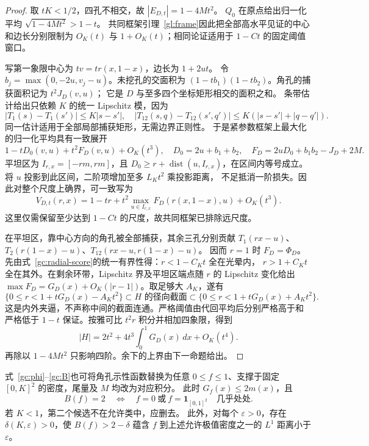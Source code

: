 \begin{proof}
取 $tK<1/2$，四孔不相交，故 $|E_{D,t}|=1-4Mt^2$。
$Q_0$ 在原点给出归一化平均 $\sqrt{1-4Mt^2}>1-t$。
共同框架引理~\ref{gl:frame}因此把全部高水平见证的中心和边长分别限制为
$O_K(t)$ 与 $1+O_K(t)$；相同论证适用于 $1-Ct$ 的固定阈值窗口。

写第一象限中心为 $tv=tr(x,1-x)$，边长为 $1+2ut$。
令 $b_j=\max(0,-2u,v_j-u)$。未挖孔的交面积为
$(1-tb_1)(1-tb_2)$。角孔的捕获面积记为 $t^2J_D(v,u)$；
它是 $D$ 与至多四个坐标矩形相交的面积之和。
条带估计给出只依赖 $K$ 的统一 Lipschitz 模，因为
\[
 |T_1(s)-T_1(s')|\le K|s-s'|,\quad
 |T_{12}(s,q)-T_{12}(s',q')|\le K(|s-s'|+|q-q'|).
\]
同一估计适用于全部局部捕获矩形，无需边界正则性。
于是紧参数框架上最大化的归一化平均具有一致展开
\[
 1-tD_0(v,u)+t^2F_D(v,u)+O_K(t^3),\quad
 D_0=2u+b_1+b_2,\quad F_D=2uD_0+b_1b_2-J_D+2M.
\]
平坦区为 $I_{r,x}=[-rm,rm]$，且
$D_0\ge r+\operatorname{dist}(u,I_{r,x})$，在区间内等号成立。
将 $u$ 投影到此区间，二阶项增加至多 $L_Kt^2$ 乘投影距离，
不足抵消一阶损失。因此对整个尺度上确界，可一致写为
\begin{equation}\label{gc:radial-score}
 V_{D,t}(r,x)=1-tr+t^2\max_{u\in I_{r,x}}F_D(r(x,1-x),u)+O_K(t^3).
\end{equation}
这里仅需保留至少达到 $1-Ct$ 的尺度，故共同框架已排除远尺度。

在平坦区，靠中心方向的角孔被全部捕获，其余三孔分别贡献
$T_1(rx-u)$、$T_2(r(1-x)-u)$、$T_{12}(rx-u,r(1-x)-u)$。
因而 $r=1$ 时 $F_D=\Phi_D$。
先由式~\eqref{gc:radial-score}的统一有界性得：$r<1-C_Kt$ 全在光晕内，
$r>1+C_Kt$ 全在其外。在剩余环带，Lipschitz 界及平坦区端点随 $r$ 的
Lipschitz 变化给出 $\max F_D=G_D(x)+O_K(|r-1|)$。取足够大 $A_K$，遂有
\[
 \{0\le r<1+tG_D(x)-A_Kt^2\}\subset H\text{ 的径向截面}
 \subset\{0\le r<1+tG_D(x)+A_Kt^2\}.
\]
这是内外夹逼，不声称中间的截面连通。严格阈值由代回平均后分别严格高于和
严格低于 $1-t$ 保证。按雅可比 $t^2r$ 积分并相加四象限，得到
\[
 |H|=2t^2+4t^3\int_0^1G_D(x)\,dx+O_K(t^4).
\]
再除以 $1-4Mt^2$ 只影响四阶。余下的上界由下一命题给出。
\end{proof}

\begin{proposition}\label{gc:rigidity}
式~\eqref{gc:phi}--\eqref{gc:B}也可将角孔示性函数替换为任意
$0\le f\le1$、支撑于固定 $[0,K]^2$ 的密度，尾量及 $M$ 均改为对应积分。
此时 $G_f(x)\le2m(x)$，且
\[
 B(f)=2\quad\Longleftrightarrow\quad
 f=0\ \text{或}\ f=\mathbf1_{[0,1]^2}\quad\text{几乎处处}.
\]
若 $K<1$，第二个候选不在允许类中，应删去。
此外，对每个 $\varepsilon>0$，存在 $\delta(K,\varepsilon)>0$，使
$B(f)>2-\delta$ 蕴含 $f$ 到上述允许极值密度之一的 $L^1$ 距离小于 $\varepsilon$。
\end{proposition}

